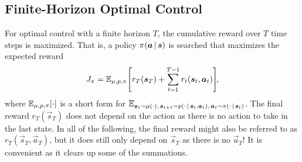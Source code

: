 		\subsection{Finite-Horizon Optimal Control}
			For optimal control with a finite horizon \(T\), the cumulative reward over \(T\) time steps is maximized. That is, a policy \(\pi(\bm{a} \,\vert\, \bm{s})\) is searched that maximizes the expected reward
			\begin{equation}
				J_\pi = \mathbb{E}_{\mu, p, \pi}\Bigg[ r_T(\bm{s}_T) + \sum_{t = 1}^{T - 1} r_t(\bm{s}_t, \bm{a}_t) \Bigg]\!,  \label{eq:expectedLongTermReward}
			\end{equation}
			where \( \mathbb{E}_{\mu, p, \pi}[\cdot] \) is a short form for \( \mathbb{E}_{\bm{s}_1 \sim \mu(\cdot),\, \bm{s}_{t + 1} \sim p(\cdot \,\vert\, \bm{s}_t, \bm{a}_t),\, \bm{a}_t \sim \pi(\cdot \,\vert\, \bm{s}_t) } \). The final reward \( r_T(\vec{s}_T) \) does not depend on the action as there is no action to take in the last state. In all of the following, the final reward might also be referred to as \( r_T(\vec{s}_T, \vec{a}_T) \), but it does still only depend on \( \vec{s}_T \) as there is no \( \vec{a}_T \)! It is convenient as it clears up some of the summations.

